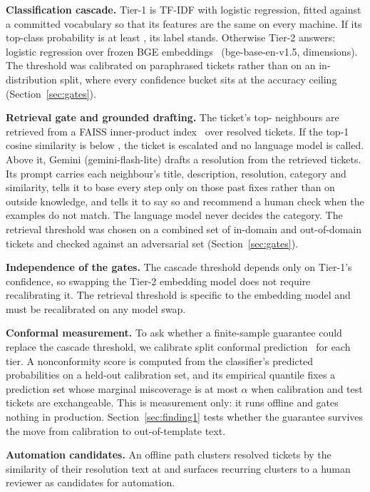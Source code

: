 \documentclass[conference,a4paper]{IEEEtran}
\begin{document}
\textbf{Classification cascade.} Tier-1 is TF-IDF with logistic regression, fitted against a committed vocabulary so that its features are the same on every machine. If its top-class probability is at least , its label stands. Otherwise Tier-2 answers: logistic regression over frozen BGE embeddings~\cite{bge} (bge-base-en-v1.5,  dimensions). The threshold was calibrated on paraphrased tickets rather than on an in-distribution split, where every confidence bucket sits at the accuracy ceiling (Section~\ref{sec:gates}).

\textbf{Retrieval gate and grounded drafting.} The ticket's top- neighbours are retrieved from a FAISS inner-product index~\cite{faiss} over resolved tickets. If the top-1 cosine similarity is below , the ticket is escalated and no language model is called. Above it, Gemini (gemini-flash-lite) drafts a resolution from the retrieved tickets. Its prompt carries each neighbour's title, description, resolution, category and similarity, tells it to base every step only on those past fixes rather than on outside knowledge, and tells it to say so and recommend a human check when the examples do not match. The language model never decides the category. The retrieval threshold was chosen on a combined set of in-domain and out-of-domain tickets and checked against an adversarial set (Section~\ref{sec:gates}).

\textbf{Independence of the gates.} The cascade threshold depends only on Tier-1's confidence, so swapping the Tier-2 embedding model does not require recalibrating it. The retrieval threshold is specific to the embedding model and must be recalibrated on any model swap.

\textbf{Conformal measurement.} To ask whether a finite-sample guarantee could replace the cascade threshold, we calibrate split conformal prediction~\cite{vovk_alrw,angelopoulos_gentle} for each tier. A nonconformity score is computed from the classifier's predicted probabilities on a held-out calibration set, and its empirical quantile fixes a prediction set whose marginal miscoverage is at most $\alpha$ when calibration and test tickets are exchangeable. This is measurement only: it runs offline and gates nothing in production. Section~\ref{sec:finding1} tests whether the guarantee survives the move from calibration to out-of-template text.

\textbf{Automation candidates.} An offline path clusters resolved tickets by the similarity of their resolution text at  and surfaces recurring clusters to a human reviewer as candidates for automation.
\end{document}
